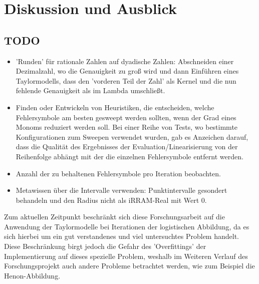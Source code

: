 
\chapter{Diskussion und Ausblick}
\label{ch:fazit}
\section{TODO}
\begin{itemize}
    \item 'Runden' für rationale Zahlen auf dyadische Zahlen: Abschneiden einer Dezimalzahl, wo die Genauigkeit zu groß wird und dann Einführen eines Taylormodells, dass den 'vorderen Teil der Zahl' als Kernel und die nun fehlende Genauigkeit als im Lambda umschließt.
    \item Finden oder Entwickeln von Heuristiken, die entscheiden, welche Fehlersymbole am besten gesweept werden sollten, wenn der Grad eines Monoms reduziert werden soll. Bei einer Reihe von Tests, wo bestimmte Konfigurationen zum Sweepen verwendet wurden, gab es Anzeichen darauf, dass die Qualität des Ergebnisses der Evaluation/Linearisierung von der Reihenfolge abhängt mit der die einzelnen Fehlersymbole entfernt werden.
    \item Anzahl der zu behaltenen Fehlersymbole pro Iteration beobachten.
    \item Metawissen über die Intervalle verwenden: Punktintervalle gesondert behandeln und den Radius nicht als iRRAM-Real mit Wert 0.
\end{itemize}

Zum aktuellen Zeitpunkt beschränkt sich diese Forschungsarbeit auf die Anwendung der Taylormodelle bei Iterationen der logistischen Abbildung, da es sich hierbei um ein gut verstandenes und viel untersuchtes Problem handelt. Diese Beschränkung birgt jedoch die Gefahr des 'Overfittings' der Implementierung auf dieses spezielle Problem, weshalb im Weiteren Verlauf des Forschungsprojekt auch andere Probleme betrachtet werden, wie zum Beispiel die Henon-Abbildung.

